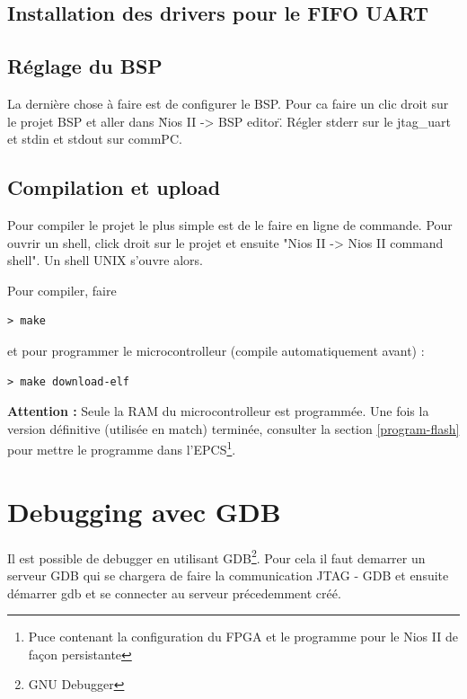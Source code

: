 \documentclass[a4paper]{report}
\begin{document}
\section{Installation des drivers pour le FIFO UART}

\section{Réglage du BSP}
La dernière chose à faire est de configurer le BSP. Pour ca faire un clic droit sur le
projet BSP et aller dans \"Nios II -> BSP editor\". Régler stderr sur le jtag\_uart et stdin et stdout sur commPC.

\section{Compilation et upload}
Pour compiler le projet le plus simple est de le faire en ligne de commande. Pour
ouvrir un shell, click droit sur le projet et ensuite "Nios II -> Nios II command shell". 
Un shell UNIX s'ouvre alors.



Pour compiler, faire
\begin{lstlisting}[frame=trBL]
> make
\end{lstlisting}

et pour programmer le microcontrolleur (compile automatiquement avant) :
\begin{lstlisting}[frame=trBL]
> make download-elf
\end{lstlisting}

\textbf{Attention :} Seule la RAM du microcontrolleur est programmée. Une fois la
version définitive (utilisée en match) terminée, consulter la section \ref{program-flash}
pour mettre le programme dans l'\textsc{EPCS}\footnote{Puce contenant la configuration du FPGA
et le programme pour le Nios II de façon persistante}.

\chapter{Debugging avec GDB}
Il est possible de debugger en utilisant GDB\footnote{GNU Debugger}. Pour cela il faut demarrer
un serveur GDB qui se chargera de faire la communication JTAG - GDB et ensuite démarrer gdb et se connecter
au serveur précedemment créé.
\end{document}

